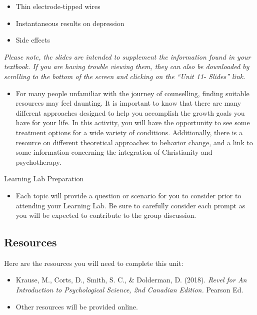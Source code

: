 \documentclass[
]{book}
\providecommand{\tightlist}{%
  \setlength{\itemsep}{0pt}\setlength{\parskip}{0pt}}
\begin{document}
\begin{reflect}
\begin{itemize}
  \begin{itemize}
  \tightlist
  \item
    Thin electrode-tipped wires\\
  \item
    Instantaneous results on depression\\
  \item
    Side effects
  \end{itemize}
\end{itemize}

\emph{Please note, the slides are intended to supplement the information found in your textbook. If you are having trouble viewing them, they can also be downloaded by scrolling to the bottom of the screen and clicking on the ``Unit 11- Slides'' link.}

\begin{itemize}
\tightlist
\item
  For many people unfamiliar with the journey of counselling, finding suitable resources may feel daunting. It is important to know that there are many different approaches designed to help you accomplish the growth goals you have for your life. In this activity, you will have the opportunity to see some treatment options for a wide variety of conditions. Additionally, there is a resource on different theoretical approaches to behavior change, and a link to some information concerning the integration of Christianity and psychotherapy.
\end{itemize}

{Learning Lab Preparation}

\begin{itemize}
\tightlist
\item
  Each topic will provide a question or scenario for you to consider prior to attending your Learning Lab. Be sure to carefully consider each prompt as you will be expected to contribute to the group discussion.
\end{itemize}
\end{reflect}

\hypertarget{resources-12}{%
\subsection*{Resources}\label{resources-12}}

Here are the resources you will need to complete this unit:

\begin{itemize}
\tightlist
\item
  Krause, M., Corts, D., Smith, S. C., \& Dolderman, D. (2018). \emph{Revel for An Introduction to Psychological Science, 2nd Canadian Edition.} Pearson Ed.\\
\item
  Other resources will be provided online.
\end{itemize}
\end{document}
